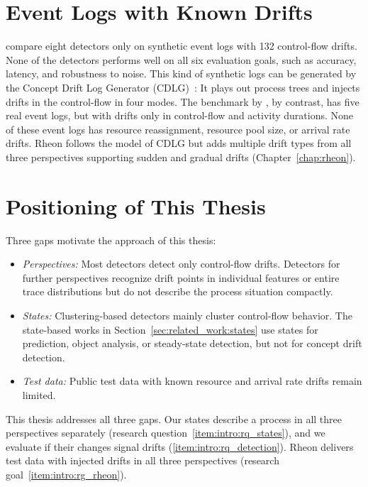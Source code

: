\section{Event Logs with Known Drifts}
\label{sec:related_work:logs}
\Textcite{adams2023experimental} compare eight detectors only on synthetic event logs with 132 control-flow drifts. None of the detectors performs well on all six evaluation goals, such as accuracy, latency, and robustness to noise. This kind of synthetic logs can be generated by the Concept Drift Log Generator (CDLG)~\autocite{grimm2022cdlg}: It plays out process trees and injects drifts in the control-flow in four modes. The benchmark by \textcite{padella2026everything}, by contrast, has five real event logs, but with drifts only in control-flow and activity durations. None of these event logs has resource reassignment, resource pool size, or arrival rate drifts. Rheon follows the model of CDLG but adds multiple drift types from all three perspectives supporting sudden and gradual drifts (Chapter~\ref{chap:rheon}).


\section{Positioning of This Thesis}
\label{sec:related_work:positioning}
Three gaps motivate the approach of this thesis:
\begin{itemize}
	\item \emph{Perspectives:} Most detectors detect only control-flow drifts. Detectors for further perspectives recognize drift points in individual features or entire trace distributions but do not describe the process situation compactly.
	\item \emph{States:} Clustering-based detectors mainly cluster control-flow behavior. The state-based works in Section~\ref{sec:related_work:states} use states for prediction, object analysis, or steady-state detection, but not for concept drift detection.
	\item \emph{Test data:} Public test data with known resource and arrival rate drifts remain limited.
\end{itemize}
This thesis addresses all three gaps. Our states describe a process in all three perspectives separately (research question~\ref{item:intro:rq_states}), and we evaluate if their changes signal drifts (\ref{item:intro:rq_detection}). Rheon delivers test data with injected drifts in all three perspectives (research goal~\ref{item:intro:rg_rheon}).
